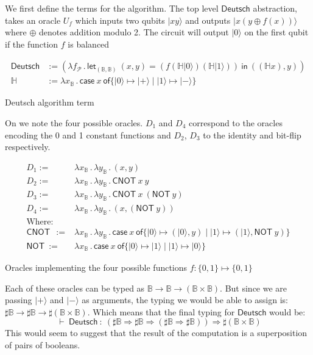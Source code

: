\documentclass[runningheads,orivec]{llncs}
\newcommand\ket[1]{\ensuremath{|#1\rangle}}
\newcommand\AbsBasis{\ensuremath{\mathcal{P}}}
\def\Pair#1#2{(#1,#2)} %
\def\Lam#1#2#3{\lambda#1_{#2}\,{.}\,#3} %
\def\letkeyword{\mathsf{let}}
\def\inkeyword{\mathsf{in}}
\def\LetP#1#2#3#4#5#6{\letkeyword_{\Pair{#2}{#4}}~\Pair{#1}{#3}=#5~\inkeyword~#6}
\def\case#1#2#3#4#5{\ensuremath{\mathsf{case}~#1~\mathsf{of} \{#2\mapsto #4 \mid #3\mapsto #5\}}}
\def\Arr{\Rightarrow}
\def\TYP#1#2#3{#1~{\vdash}~#2~{:}~#3}
\newcommand\B{\mathbb B}
\newcommand\Hd{\mathbb{H}}
\newcommand{\cnot}[2]{\mathsf{CNOT}\ #1\ #2}
\newcommand{\pauliX}[1]{\mathsf{NOT}\ #1}
\begin{document}
We first define the terms for the algorithm. The top level $\mathsf{Deutsch}$ abstraction, takes an oracle $U_f$  which inputs two qubits $\ket{x y}$ and outputs $\ket{x (y\oplus f(x))}$ where $\oplus$ denotes addition modulo 2. The circuit will output $\ket{0}$ on the first qubit if the function $f$ is balanced 
\begin{table*}
    \small
    \begin{align*}
        \mathsf{Deutsch} &:= 
        (\Lam{{f}}{\AbsBasis}{
                \LetP{x}{\B}{y}{\B}
                {(f (\Hd \ket{0}) (\Hd \ket{1}))}
                {\Pair{(\Hd x)}{y}}
        })\\
        \Hd &:= \Lam{x}{\B}{\case{x}{\ket{0}}{\ket{1}}{\ket{+}}{\ket{-}}}
    \end{align*}
    \caption{Deutsch algorithm term}
\end{table*}

On  we note the four possible oracles. $D_1$ and $D_4$ correspond to the oracles encoding the 0 and 1 constant functions and $D_2$, $D_3$ to the identity and bit-flip respectively.

\begin{table*}
    \scriptsize
    \begin{align*}
        D_1 :=& \Lam{x}{\B}{\Lam{y}{\B}{\Pair{x}{y}}}\\
        D_2 :=& \Lam{x}{\B}{\Lam{y}{\B}{\cnot{x}{y}}}\\
        D_3 :=& \Lam{x}{\B}{\Lam{y}{\B}{\cnot{x}{(\pauliX{y})}}}\\
        D_4 :=& \Lam{x}{\B}{\Lam{y}{\B}{\Pair{x}{(\pauliX{y})}}}\\
        \text{Where:} &\\
        \cnot{}{} :=& \Lam{x}{\B}{\Lam{y}{\B}{
        \case{x}
        {\ket{0}}{\ket{1}}
        {\Pair{\ket{0}}{y}}{\Pair{\ket{1}}{\pauliX{y}}}}}\\
        \pauliX{} :=& \Lam{x}{\B}{\case{x}{\ket{0}}{\ket{1}}{\ket{1}}{\ket{0}}}
    \end{align*}
    
    \caption{Oracles implementing the four possible functions $f:\{0,1\}\mapsto\{0,1\}$}
    \label{tab:Oracles}
\end{table*}

Each of these oracles can be typed as $\B\to\B\to(\B\times\B)$. But since we are passing $\ket{+}$ and $\ket{-}$ as arguments, the typing we would be able to assign is: $\sharp\B\to\sharp\B\to\sharp(\B\times\B)$. Which means that the final typing for $\mathsf{Deutsch}$ would be:
\[
\TYP{}{\mathsf{Deutsch}}{(\sharp\B\Arr\sharp\B\Arr(\sharp\B\Arr\sharp\B))\Arr\sharp(\B\times\B)}
\]
This would seem to suggest that the result of the computation is a superposition of pairs of booleans.
\end{document}
